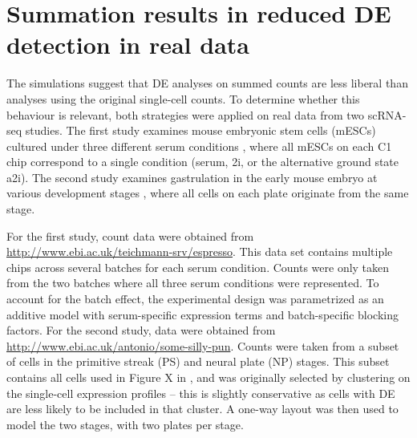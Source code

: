\documentclass{article}
\begin{document}
\section{Summation results in reduced DE detection in real data}
The simulations suggest that DE analyses on summed counts are less liberal than analyses using the original single-cell counts.
To determine whether this behaviour is relevant, both strategies were applied on real data from two scRNA-seq studies.
The first study examines mouse embryonic stem cells (mESCs) cultured under three different serum conditions \cite{kolod2015single},
    where all mESCs on each C1 chip correspond to a single condition (serum, 2i, or the alternative ground state a2i).
The second study examines gastrulation in the early mouse embryo at various development stages \cite{scialdone2015single},
    where all cells on each plate originate from the same stage.

For the first study, count data were obtained from \url{http://www.ebi.ac.uk/teichmann-srv/espresso}. 
This data set contains multiple chips across several batches for each serum condition.
Counts were only taken from the two batches where all three serum conditions were represented.
To account for the batch effect, the experimental design was parametrized as an additive model with serum-specific expression terms and batch-specific blocking factors.
For the second study, data were obtained from \url{http://www.ebi.ac.uk/antonio/some-silly-pun}.
Counts were taken from a subset of cells in the primitive streak (PS) and neural plate (NP) stages.
This subset contains all cells used in Figure X in \cite{scialdone2015single}, and was originally selected by clustering on the single-cell expression profiles 
    -- this is slightly conservative as cells with DE are less likely to be included in that cluster.
A one-way layout was then used to model the two stages, with two plates per stage.

\end{document}
